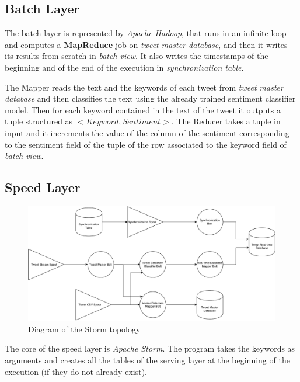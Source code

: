 \documentclass[10pt,twocolumn,letterpaper]{article}
\begin{document}

\subsection{Batch Layer}
The batch layer is represented by \emph{Apache Hadoop}, that runs in an infinite loop and computes a \textbf{MapReduce} job on \emph{tweet master database}, and then it writes its results from scratch in \emph{batch view}. It also writes the timestamps of the beginning and of the end of the execution in \emph{synchronization table}. 

The Mapper reads the text and the keywords of each tweet from \emph{tweet master database} and then classifies the text using the already trained sentiment classifier model. Then for each keyword contained in the text of the tweet it outputs a tuple structured as \emph{$<Keyword, Sentiment>$}. The Reducer takes a tuple in input and it increments the value of the column of the sentiment corresponding to the sentiment field of the tuple of the row associated to the keyword field of \emph{batch view}.


\subsection{Speed Layer}

\begin{figure}[t!]
\includegraphics[width=0.95\linewidth]{img/storm_topology_diagram}
\vspace{0.5cm}
\caption{Diagram of the Storm topology}
\label{fig:storm_topology_diagram}
\end{figure}

The core of the speed layer is \emph{Apache Storm}. The program takes the keywords as arguments and creates all the tables of the serving layer at the beginning of the execution (if they do not already exist).
\end{document}
